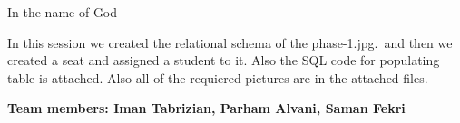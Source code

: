 \documentclass[12pt]{article}
\begin{document}
\centering In the name of God

In this session we created the relational schema of the phase-1.jpg.\
and then we created a seat and assigned a student to it. Also the SQL code for
populating table is attached. Also all of the requiered pictures are in the attached
files.

\small{\textbf{Team members: Iman Tabrizian, Parham Alvani, Saman Fekri}}
\end{document}
